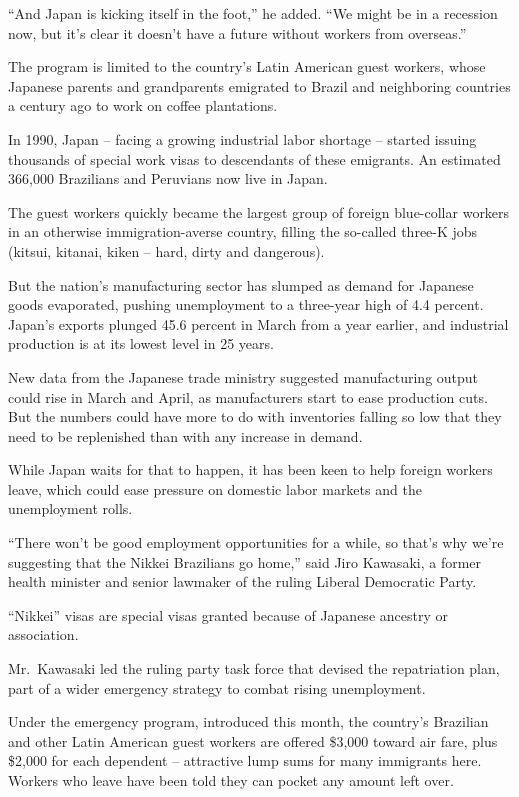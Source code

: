 \documentclass[12pt,a4paper,onecolumn]{article}
\begin{document}
``And Japan is kicking itself in the foot,'' he added. ``We might be in a recession now, but it's
clear it doesn't have a future without workers from overseas.''

The program is limited to the country's Latin American guest workers, whose Japanese parents and
grandparents emigrated to Brazil and neighboring countries a century ago to work on coffee
plantations.

In 1990, Japan -- facing a growing industrial labor shortage -- started issuing thousands of special
work visas to descendants of these emigrants. An estimated 366,000 Brazilians and Peruvians now live
in Japan.

The guest workers quickly became the largest group of foreign blue-collar workers in an otherwise
immigration-averse country, filling the so-called three-K jobs (kitsui, kitanai, kiken -- hard,
dirty and dangerous).

But the nation's manufacturing sector has slumped as demand for Japanese goods evaporated, pushing
unemployment to a three-year high of 4.4 percent. Japan's exports plunged 45.6 percent in March from
a year earlier, and industrial production is at its lowest level in 25 years.

New data from the Japanese trade ministry suggested manufacturing output could rise in March and
April, as manufacturers start to ease production cuts. But the numbers could have more to do with
inventories falling so low that they need to be replenished than with any increase in demand.

While Japan waits for that to happen, it has been keen to help foreign workers leave, which could
ease pressure on domestic labor markets and the unemployment rolls.

``There won't be good employment opportunities for a while, so that's why we're suggesting that the
Nikkei Brazilians go home,'' said Jiro Kawasaki, a former health minister and senior lawmaker of the
ruling Liberal Democratic Party.

``Nikkei'' visas are special visas granted because of Japanese ancestry or association.

Mr.~Kawasaki led the ruling party task force that devised the repatriation plan, part of a wider
emergency strategy to combat rising unemployment.

Under the emergency program, introduced this month, the country's Brazilian and other Latin American
guest workers are offered \$3,000 toward air fare, plus \$2,000 for each dependent -- attractive
lump sums for many immigrants here. Workers who leave have been told they can pocket any amount left
over.
\end{document}
